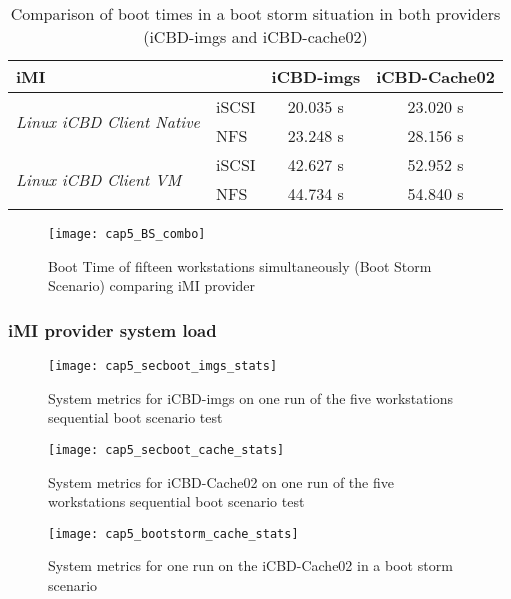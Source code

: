 \begin{table}[]
\centering
\begin{tabular}{llcc}
\textbf{iMI} & \textbf{} & \textbf{iCBD-imgs} & \textbf{iCBD-Cache02} \\ \hline
\multirow{2}{*}{\textit{Linux iCBD Client Native}} & iSCSI & 20.035 s & 23.020 s \\
 & NFS & 23.248 s & 28.156 s \\ \hline
\multirow{2}{*}{\textit{Linux iCBD Client VM}} & iSCSI & 42.627 s & 52.952 s \\
 & NFS & 44.734 s & 54.840 s
\end{tabular}
	\caption{Comparison of boot times in a boot storm situation in both providers (iCBD-imgs and iCBD-cache02)}
	\label{tab:bootstorm_both}
\end{table}


\begin{figure}[htbp]
	\centering
	\texttt{[image: cap5\_BS\_combo]}
	\caption{Boot Time of fifteen workstations simultaneously (Boot Storm Scenario) comparing iMI provider}
	\label{fig:bootstorm_time}
\end{figure}


\subsubsection{iMI provider system load}
\label{susub:eval_sys_load}

\begin{figure}[htbp]
	\centering
	\texttt{[image: cap5\_secboot\_imgs\_stats]}
	\caption{System metrics for iCBD-imgs on one run of the five workstations sequential boot scenario test}
	\label{fig:boot_imgs_stats}
\end{figure}


\begin{figure}[htbp]
	\centering
	\texttt{[image: cap5\_secboot\_cache\_stats]}
	\caption{System metrics for iCBD-Cache02 on one run of the five workstations sequential boot scenario test}
	\label{fig:boot_cache_stats}
\end{figure}


\begin{figure}[htbp]
	\centering
	\texttt{[image: cap5\_bootstorm\_cache\_stats]}
	\caption{System metrics for one run on the iCBD-Cache02 in a boot storm scenario}
	\label{fig:boot_cache_stats}
\end{figure}


